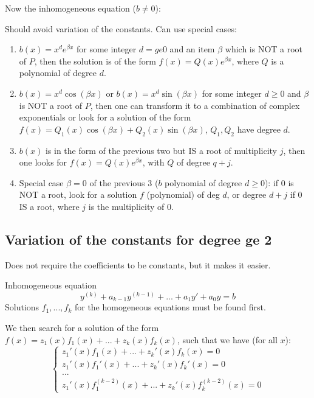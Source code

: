 \documentclass[8pt,a4paper,twocolumn,table]{extarticle}
\begin{document}
Now the inhomogeneous equation ($b \ne 0$):

Should avoid variation of the constants. Can use special cases:
\begin{enumerate}
    \item $b(x) = x^d e^{\beta x}$ for some integer $d =ge 0$ and an item $\beta$ which is NOT a root of $P$, then
          the solution is of the form $f(x) = Q(x) e^{\beta x}$, where $Q$ is a polynomial of degree $d$.
    \item $b(x) = x^d \cos(\beta x)$ or $b(x) = x^d \sin(\beta x)$ for some integer $d \ge 0$ and $\beta$ is NOT a root of $P$, then
          one can transform it to a combination of complex exponentials or look for a solution of the form
          $f(x) = Q_1(x) \cos(\beta x) + Q_2(x) \sin(\beta x)$, $Q_1, Q_2$ have degree $d$.
    \item $b(x)$ is in the form of the previous two but IS a root of multiplicity $j$, then one looks for $f(x) = Q(x) e^{\beta x} $,
          with $Q$ of degree $q + j$.
    \item Special case $\beta = 0$ of the previous 3 ($b$ polynomial of degree $d \ge 0$): if $0$ is NOT a root, look for a
          solution $f$ (polynomial) of deg $d$, or degree $d + j$ if $0$ IS a root, where $j$ is the multiplicity of $0$.
\end{enumerate}

\subsection{Variation of the constants for degree ge 2}

Does not require the coefficients to be constants, but it makes it easier.

Inhomogeneous equation \[ y^{(k)} + a_{k-1} y^{(k - 1)} + ... + a_1 y' + a_0 y = b \]
Solutions $f_1, ..., f_k$ for the homogeneous equations must be found first.

We then search for a solution of the form $f(x) = z_1(x) f_1(x) + ... + z_k(x) f_k(x)$, such that we have (for all $x$):
\[
    \begin{cases}
        z_1'(x) f_1(x) + ... + z_k'(x) f_k(x) = 0   \\
        z_1'(x) f_1'(x) + ... + z_k'(x) f_k'(x) = 0 \\
        ...                                         \\
        z_1'(x) f_1^{(k-2)}(x) + ... + z_k'(x) f_k^{(k-2)}(x) = 0
    \end{cases}
\]
\end{document}
